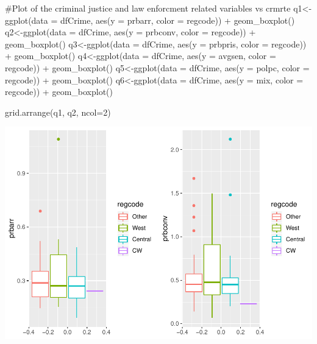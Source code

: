 \documentclass[]{article}
\newenvironment{Shaded}{}{}
\newcommand{\CommentTok}[1]{\textcolor[rgb]{0.00,0.50,0.00}{#1}}
\newcommand{\DataTypeTok}[1]{#1}
\newcommand{\DecValTok}[1]{#1}
\newcommand{\KeywordTok}[1]{\textcolor[rgb]{0.00,0.00,1.00}{#1}}
\newcommand{\NormalTok}[1]{#1}
\newcommand{\OperatorTok}[1]{#1}
\newcommand{\StringTok}[1]{\textcolor[rgb]{0.00,0.50,0.50}{#1}}
\begin{document}
\begin{Shaded}
\begin{Highlighting}[]
\CommentTok{#Plot of the criminal justice and law enforcment related variables vs crmrte}
\NormalTok{q1<-}\KeywordTok{ggplot}\NormalTok{(}\DataTypeTok{data =}\NormalTok{ dfCrime, }\KeywordTok{aes}\NormalTok{(}\DataTypeTok{y =}\NormalTok{ prbarr, }\DataTypeTok{color =}\NormalTok{ regcode)) }\OperatorTok{+}
\StringTok{      }\KeywordTok{geom_boxplot}\NormalTok{()}
\NormalTok{q2<-}\KeywordTok{ggplot}\NormalTok{(}\DataTypeTok{data =}\NormalTok{ dfCrime, }\KeywordTok{aes}\NormalTok{(}\DataTypeTok{y =}\NormalTok{ prbconv, }\DataTypeTok{color =}\NormalTok{ regcode)) }\OperatorTok{+}
\StringTok{      }\KeywordTok{geom_boxplot}\NormalTok{()}
\NormalTok{q3<-}\KeywordTok{ggplot}\NormalTok{(}\DataTypeTok{data =}\NormalTok{ dfCrime, }\KeywordTok{aes}\NormalTok{(}\DataTypeTok{y =}\NormalTok{ prbpris, }\DataTypeTok{color =}\NormalTok{ regcode)) }\OperatorTok{+}
\StringTok{      }\KeywordTok{geom_boxplot}\NormalTok{()}
\NormalTok{q4<-}\KeywordTok{ggplot}\NormalTok{(}\DataTypeTok{data =}\NormalTok{ dfCrime, }\KeywordTok{aes}\NormalTok{(}\DataTypeTok{y =}\NormalTok{ avgsen, }\DataTypeTok{color =}\NormalTok{ regcode)) }\OperatorTok{+}
\StringTok{      }\KeywordTok{geom_boxplot}\NormalTok{()}
\NormalTok{q5<-}\KeywordTok{ggplot}\NormalTok{(}\DataTypeTok{data =}\NormalTok{ dfCrime, }\KeywordTok{aes}\NormalTok{(}\DataTypeTok{y =}\NormalTok{ polpc, }\DataTypeTok{color =}\NormalTok{ regcode)) }\OperatorTok{+}
\StringTok{      }\KeywordTok{geom_boxplot}\NormalTok{()}
\NormalTok{q6<-}\KeywordTok{ggplot}\NormalTok{(}\DataTypeTok{data =}\NormalTok{ dfCrime, }\KeywordTok{aes}\NormalTok{(}\DataTypeTok{y =}\NormalTok{ mix, }\DataTypeTok{color =}\NormalTok{ regcode)) }\OperatorTok{+}
\StringTok{      }\KeywordTok{geom_boxplot}\NormalTok{()}

\KeywordTok{grid.arrange}\NormalTok{(q1, q2, }\DataTypeTok{ncol=}\DecValTok{2}\NormalTok{)}
\end{Highlighting}
\end{Shaded}

\includegraphics{Bagnard_Gaustad_Hartman_Leung_Lab_3_files/figure-latex/unnamed-chunk-22-1.pdf}
\end{document}
